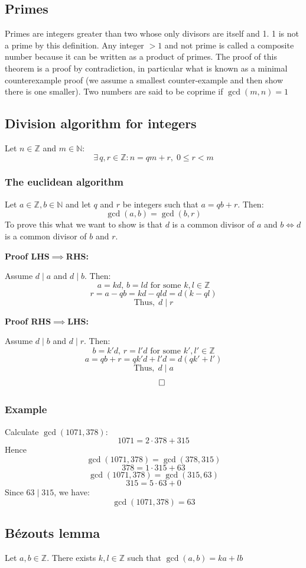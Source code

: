 \documentclass[12pt]{article}
\begin{document}
\subsection*{Primes}
Primes are integers greater than two whose only divisors are itself and 1. 1 is not a prime by this definition. Any integer \(> 1\) and not prime is called a composite number because it can be written as a product of primes. The proof of this theorem is a proof by contradiction, in particular what is known as a minimal counterexample proof (we assume a smallest counter-example and then show there is one smaller). Two numbers are said to be coprime if \(\gcd(m,n)=1\)
\subsection*{Division algorithm for integers}
Let \(n\in\mathbb{Z}\) and \(m\in\mathbb{N}\):
\[\exists\,q,r \in \mathbb{Z}:n=qm+r,\; 0\leq r<m\]
\subsubsection*{The euclidean algorithm}
Let \(a\in \mathbb{Z}, b\in \mathbb{N}\) and let \(q\) and \(r\) be integers such that \(a=qb+r\). Then:
\[\gcd(a,b)=\gcd(b,r)\]
To prove this what we want to show is that \(d\) is a common divisor of \(a\) and \(b \iff d\) is a common divisor of \(b\) and \(r\).

\textbf{Proof LHS\(\implies\)RHS:}

Assume \(d\mid a\) and \(d \mid b\). Then:
\[a=kd,\,b=ld\text{ for some }k,l\in\mathbb{Z}\]
\[r=a-qb=kd-qld=d(k-ql)\]
\[\text{Thus},\;d\mid r\]

\textbf{Proof RHS\(\implies\)LHS:}

Assume \(d\mid b\) and \(d \mid r\). Then:
\[b=k'd,\,r=l'd\text{ for some }k',l'\in\mathbb{Z}\]
\[a=qb+r=qk'd+l'd=d(qk'+l')\]
\[\text{Thus},\;d\mid a\]
\[\qed\]
\subsubsection*{Example}
Calculate \(\gcd(1071,378)\):
\[1071=2\cdot378+315\]
Hence
\[\gcd(1071,378)=\gcd(378,315)\]
\[378=1\cdot315+63\]
\[\gcd(1071,378)=\gcd(315,63)\]
\[315=5\cdot63+0\]
Since \(63 \mid 315\), we have:
\[\gcd(1071,378)=63\]
\subsection*{B\'ezouts lemma}
Let \(a,b\in\mathbb{Z}\). There exists \(k,l\in\mathbb{Z}\) such that \(\gcd(a,b)=ka+lb\)
\end{document}
